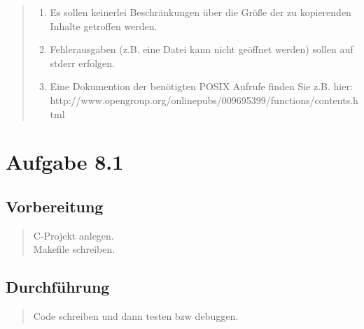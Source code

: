 \begin{quote}
\begin{enumerate}
			\item Es sollen keinerlei Beschr\"ankungen \"uber die Gr\"oße der zu kopierenden Inhalte getroffen werden.\\
			\item Fehlerausgaben (z.B. eine Datei kann nicht ge\"offnet werden) sollen auf stderr erfolgen.\\
			\item Eine Dokumention der ben\"otigten POSIX Aufrufe finden Sie z.B. hier:\\
			http://www.opengroup.org/onlinepubs/009695399/functions/contents.html\\
		\end{enumerate}
	\end{quote}
\newpage
\section{Aufgabe 8.1}
	\subsection{Vorbereitung}
		\begin{quote}
			C-Projekt anlegen.\\
			Makefile schreiben.\\
		\end{quote}
	\subsection{Durchführung}
		\begin{quote}
			Code schreiben und dann testen bzw debuggen.\\
		\end{quote}
